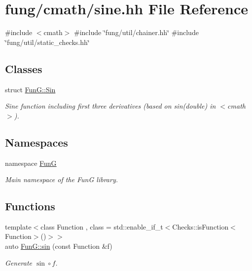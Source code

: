\hypertarget{sine_8hh}{\section{fung/cmath/sine.hh \-File \-Reference}
\label{sine_8hh}
}
{\ttfamily \#include $<$cmath$>$}\*
{\ttfamily \#include \char`\"{}fung/util/chainer.\-hh\char`\"{}}\*
{\ttfamily \#include \char`\"{}fung/util/static\-\_\-checks.\-hh\char`\"{}}\*
\subsection*{\-Classes}
\begin{DoxyCompactItemize}
\item 
struct \hyperlink{structFunG_1_1Sin}{\-Fun\-G\-::\-Sin}
\begin{DoxyCompactList}\small\item\em \-Sine function including first three derivatives (based on sin(double) in $<$cmath$>$). \end{DoxyCompactList}\end{DoxyCompactItemize}
\subsection*{\-Namespaces}
\begin{DoxyCompactItemize}
\item 
namespace \hyperlink{namespaceFunG}{\-Fun\-G}
\begin{DoxyCompactList}\small\item\em \-Main namespace of the \-Fun\-G library. \end{DoxyCompactList}\end{DoxyCompactItemize}
\subsection*{\-Functions}
\begin{DoxyCompactItemize}
\item 
{\footnotesize template$<$class Function , class  = std\-::enable\-\_\-if\-\_\-t$<$\-Checks\-::is\-Function$<$\-Function$>$()$>$$>$ }\\auto \hyperlink{group__CMathGroup_ga663fdbe7a8977cba529c7c33981b7738}{\-Fun\-G\-::sin} (const \-Function \&f)
\begin{DoxyCompactList}\small\item\em \-Generate $ \sin\circ f $. \end{DoxyCompactList}\end{DoxyCompactItemize}
